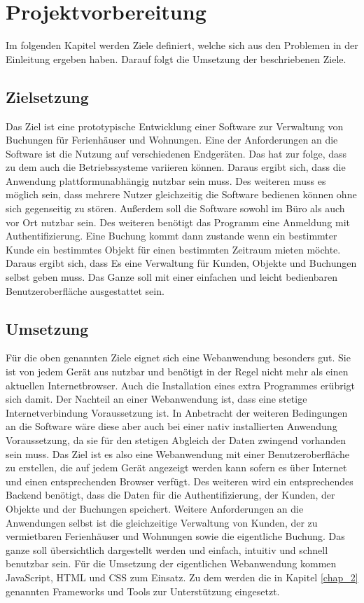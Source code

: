 \chapter{Projektvorbereitung}
Im folgenden Kapitel werden Ziele definiert, welche sich aus den Problemen in der Einleitung ergeben haben. Darauf folgt die Umsetzung der beschriebenen Ziele.

\section{Zielsetzung}
Das Ziel ist eine prototypische Entwicklung einer Software zur Verwaltung von Buchungen für Ferienhäuser und Wohnungen. 
Eine der Anforderungen an die Software ist die Nutzung auf verschiedenen Endgeräten. Das hat zur folge, dass zu dem auch die Betriebssysteme variieren können. Daraus ergibt sich, dass die Anwendung plattformunabhängig nutzbar sein muss. Des weiteren muss es möglich sein, dass mehrere Nutzer gleichzeitig die Software bedienen können ohne sich gegenseitig zu stören. Außerdem soll die Software sowohl im Büro als auch vor Ort nutzbar sein.
Des weiteren benötigt das Programm eine Anmeldung mit Authentifizierung. 
Eine Buchung kommt dann zustande wenn ein bestimmter Kunde ein bestimmtes Objekt für einen bestimmten Zeitraum mieten möchte. Daraus ergibt sich, dass Es eine Verwaltung für Kunden, Objekte und Buchungen selbst geben muss. 
Das Ganze soll mit einer einfachen und leicht bedienbaren Benutzeroberfläche ausgestattet sein.

\newpage
\section{Umsetzung}
Für die oben genannten Ziele eignet sich eine Webanwendung besonders gut. Sie ist von jedem Gerät aus nutzbar und benötigt in der Regel nicht mehr als einen aktuellen Internetbrowser. Auch die Installation eines extra Programmes erübrigt sich damit. Der Nachteil an einer Webanwendung ist,  dass eine stetige Internetverbindung Voraussetzung ist. In Anbetracht der weiteren Bedingungen an die Software wäre diese aber auch bei einer nativ installierten Anwendung Voraussetzung, da sie für den stetigen Abgleich der Daten zwingend vorhanden sein muss. 
Das Ziel ist es also eine Webanwendung mit einer Benutzeroberfläche zu erstellen, die auf jedem Gerät angezeigt werden kann sofern es über Internet und einen entsprechenden Browser verfügt. Des weiteren wird ein entsprechendes Backend benötigt, dass die Daten für die Authentifizierung, der Kunden, der Objekte und der Buchungen speichert.
Weitere Anforderungen an die Anwendungen selbst ist die gleichzeitige Verwaltung von Kunden, der zu vermietbaren Ferienhäuser und Wohnungen sowie die eigentliche Buchung. Das ganze soll übersichtlich dargestellt werden und einfach, intuitiv und schnell benutzbar sein.
Für die Umsetzung der eigentlichen Webanwendung kommen JavaScript, HTML und CSS zum Einsatz. Zu dem werden die in Kapitel \ref{chap_2} genannten Frameworks und Tools zur Unterstützung eingesetzt. 

